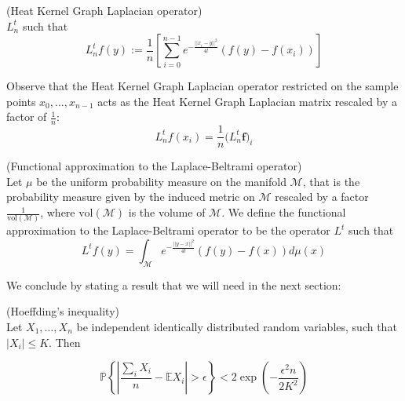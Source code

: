 \vspace{0.5cm}
\begin{definition}{}(Heat Kernel Graph Laplacian operator)\\
	\label{def:Heat Kernel Graph Laplacian operator}
	$L_n^t$ such that
	$$L_n^tf(y) := \frac{1}{n}\left[ \sum_{i=0}^{n-1} e^{-\frac{||x_i-y||^2}{4t}}\left(f(y)-f(x_i)\right)\right]$$
\end{definition}
\vspace{0.5cm}
Observe that the Heat Kernel Graph Laplacian operator restricted on the sample points $x_0, ..., x_{n-1}$ acts as the Heat Kernel Graph Laplacian matrix rescaled by a factor of $\frac{1}{n}$:
$$L_n^tf(x_i) = \frac{1}{n}\mathbf (L_n^t\mathbf f)_i$$
\vspace{0.5cm}
\begin{definition}{}(Functional approximation to the Laplace-Beltrami operator)\\ \label{eq: my L^t} Let $\mu$ be the uniform probability measure on the manifold $\mathcal M$, that is the probability measure given by the induced metric on $\mathcal M$ rescaled by a factor $\frac{1}{\text{vol}(\mathcal M)}$, where $\text{vol}(\mathcal M)$ is the volume of $\mathcal M$. We define the functional approximation to the Laplace-Beltrami operator to be the operator $L^t$ such that
	\label{def:Functional approximation to the Laplace-Beltrami operator}
	$$ L^tf(y) = \int_{\mathcal M}e^{-\frac{||y-x||^2}{4t}}\left(f(y)-f(x)\right)d\mu(x)$$
\end{definition}
\vspace{0.5cm}
We conclude by stating a result that we will need in the next section:
\vspace{0.5cm}
\begin{prop}(Hoeffding's inequality)\\
	Let \(X_{1}, \ldots, X_{n}\) be independent identically distributed random variables, such that
	\(\left|X_{i}\right| \leqslant K .\) Then
	
	$$
	\mathbb P\left\{\left|\frac{\sum_{i} X_{i}}{n}-\mathbb{E} X_{i}\right|>\epsilon\right\}<2 \exp \left(-\frac{\epsilon^{2} n}{2 K^{2}}\right)
	$$
	\label{theo:Hoeffding}
\end{prop}
